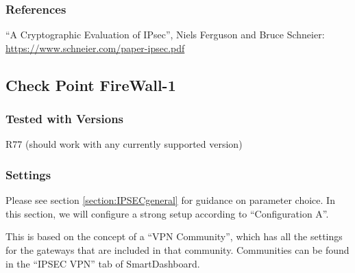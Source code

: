 
\subsubsection{References}
\begin{itemize*}
  \item ``A Cryptographic Evaluation of IPsec'', Niels Ferguson and Bruce
    Schneier: \url{https://www.schneier.com/paper-ipsec.pdf}
\end{itemize*}


\subsection{Check Point FireWall-1}


\subsubsection{Tested with Versions}
\begin{itemize*}
  \item R77 (should work with any currently supported version)
\end{itemize*}

\subsubsection{Settings}
Please see section \ref{section:IPSECgeneral} for guidance on
parameter choice. In this section, we will configure a strong setup
according to ``Configuration A''.

This is based on the concept of a ``VPN Community'', which has all the
settings for the gateways that are included in that community.
Communities can be found in the ``IPSEC VPN'' tab of SmartDashboard.

